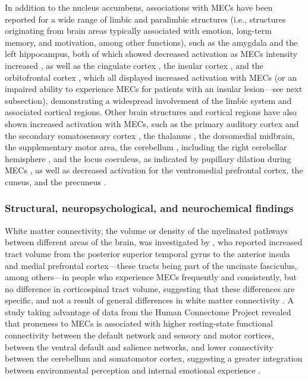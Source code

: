 In addition to the nucleus accumbens, associations with MECs have been reported for a wide range of limbic and paralimbic structures (i.e., structures originating from brain areas typically associated with emotion, long-term memory, and motivation, among other functions), such as the amygdala \parencite{griffiths2004, grunkina2017} and the left hippocampus, both of which showed decreased activation as MECs intensity increased \parencite{blood2001}, as well as the cingulate cortex \parencite{blood2001}, the insular cortex \parencite{blood2001, griffiths2004, grunkina2017, klepzig2020}, and the orbitofrontal cortex \parencite{blood2001}, which all displayed increased activation with MECs (or an impaired ability to experience MECs for patients with an insular lesion---see next subsection), demonstrating a widespread involvement of the limbic system and associated cortical regions. Other brain structures and cortical regions have also shown increased activation with MECs, such as the primary auditory cortex and the secondary somatosensory cortex \parencite{grunkina2017}, the thalamus \parencite{blood2001, grunkina2017, klepzig2020}, the dorsomedial midbrain, the supplementary motor area, the cerebellum \parencite{blood2001}, including the right cerebellar hemisphere \parencite{klepzig2020}, and the locus coeruleus, as indicated by pupillary dilation during MECs \parencite{laeng2016}, as well as decreased activation for the ventromedial prefrontal cortex, the cuneus, and the precuneus \parencite{blood2001}.

\subsubsection{Structural, neuropsychological, and neurochemical findings}

White matter connectivity, the volume or density of the myelinated pathways between different areas of the brain, was investigated by \textcite{sachs2016}, who reported increased tract volume from the posterior superior temporal gyrus to the anterior insula and medial prefrontal cortex---these tracts being part of the uncinate fasciculus, among others---in people who experience MECs frequently and consistently, but no difference in corticospinal tract volume, suggesting that these differences are specific, and not a result of general differences in white matter connectivity \parencite{sachs2016}. A study taking advantage of data from the Human Connectome Project \parencite{vanessen2013} revealed that proneness to MECs is associated with higher resting-state functional connectivity between the default network and sensory and motor cortices, between the ventral default and salience networks, and lower connectivity between the cerebellum and somatomotor cortex, suggesting a greater integration between environmental perception and internal emotional experience \parencite{williams2018}.

